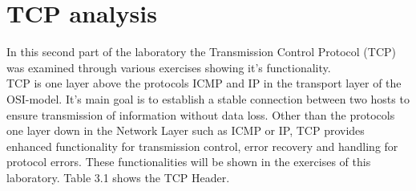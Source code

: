 \chapter{TCP analysis}
\label{tcp}
In this second part of the laboratory the Transmission Control Protocol (TCP) was examined through various exercises showing it's functionality.\\
TCP is one layer above the protocols ICMP and IP in the transport layer of the OSI-model. It's main goal is to establish a stable connection between two hosts to ensure transmission of information without data loss. Other than the protocols one layer down in the Network Layer such as ICMP or IP, TCP provides enhanced functionality for transmission control, error recovery and handling for protocol errors. These functionalities will be shown in the exercises of this laboratory. Table 3.1 shows the TCP Header.
